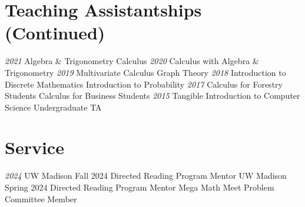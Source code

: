 \documentclass[a4paper]{cv-friggeri}
\begin{document}
\begin{asidenotit}
\section{Teaching Assistantships (Continued)}
\emph{2021}
Algebra \& Trigonometry
\vspace{0.2em}Calculus
\vspace{0.5em} \emph{2020}
Calculus with Algebra \& Trigonometry
\vspace{0.5em} \emph{2019}
Multivariate Calculus
\vspace{0.2em}Graph Theory
\vspace{0.5em} \emph{2018}
Introduction to Discrete Mathematics
\vspace{0.2em}Introduction to Probability
\vspace{0.5em} \emph{2017}
Calculus for Forestry Students
\vspace{0.2em}Calculus for Business Students
\vspace{0.5em} \emph{2015}
Tangible Introduction to Computer Science Undergraduate TA
~
\vspace{-1.3em}\section{Service}
\emph{2024}
UW Madison Fall 2024 Directed Reading Program Mentor \vspace{0.5em}
UW Madison Spring 2024 Directed Reading Program Mentor \vspace{0.5em}
Mega Math Meet Problem Committee Member
\end{asidenotit}
\end{document}
